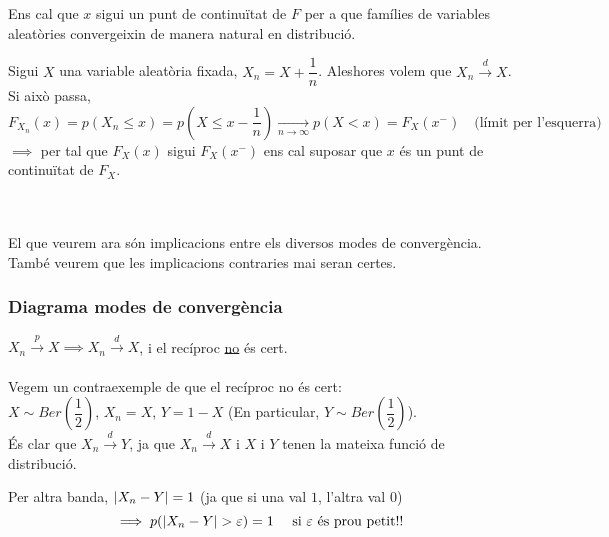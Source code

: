 \begin{obs}
  Ens cal que $x$ sigui un punt de continuïtat de $F$ per a que famílies de variables aleatòries 
  convergeixin de manera natural en distribució.
\end{obs}

\newpage

\begin{example}
  Sigui $X$ una variable aleatòria fixada, $X_n = X + \dfrac{1}{n}$. Aleshores volem que 
  $X_n \overset{d}{\longrightarrow} X$. Si això passa, 
  \[
    F_{X_n}(x) = p(X_n \leq x) = p(X \leq x -\frac{1}{n}) \underset{n\to \infty}{\longrightarrow}p(X<x) = F_X(x^-) 
    \quad \text{(límit per l'esquerra)}
  \]
  $\implies$ per tal que $F_X(x)$ sigui $F_X(x^-)$ ens cal suposar que $x$ és un punt de continuïtat de $F_X$.
\end{example}
\-\\\\
El que veurem ara  són implicacions entre els diversos modes de convergència. \\
També veurem que les implicacions contraries mai seran certes.

\subsubsection{Diagrama modes de convergència}


\begin{prop}[(I)]
  $X_n \overset{p}{\to} X \implies X_n \overset{d}{\to} X$, i el recíproc \underline{no} és cert. \\\\
  
  Vegem un contraexemple de que el recíproc no és cert: \\
  
  $X \sim Ber(\dfrac{1}{2})$, $X_n = X$, $Y = 1-X$ (En particular, $Y\sim Ber(\dfrac{1}{2})$). \\
  
  És clar que $X_n \overset{d}{\to} Y$, ja que $X_n \overset{d}{\to} X$ i $X$ i $Y$ tenen la mateixa 
  funció de distribució.
  
  Per altra banda, $\left\vert X_n - Y \right\vert = 1$ (ja que si una val $1$, l'altra val $0$)
  $$\implies p(\left\vert X_n-Y \right\vert > \varepsilon) = 1 \quad \text{ si } \varepsilon \text{ és prou petit!!}$$
\end{prop}

